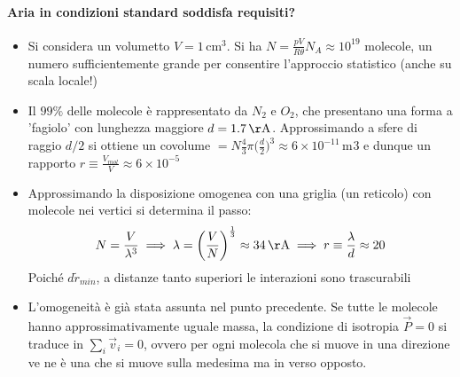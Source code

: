 \documentclass[10pt, oneside]{book}
\newcommand{\angstrom}{\, \mathrm{\AA}}
\newcommand{\meters}[2]{\, \mathrm{#2 m^{#1}}}
\begin{document}
\paragraph{Aria in condizioni standard soddisfa requisiti?} 
\begin{itemize}
\item Si considera un volumetto $V = 1 \, \mathrm{cm^3}$. Si ha $\displaystyle N = \frac{pV}{R \theta} N_A \approx 10^{19}$ molecole, un numero sufficientemente grande per consentire l'approccio statistico (anche su scala locale!)
\item Il $99 \% $ delle molecole è rappresentato da $N_2$ e $O_2$, che presentano una forma a 'fagiolo' con lunghezza maggiore $d = 1.7 \angstrom$. Approssimando a sfere di raggio $d/2$ si ottiene un covolume $\displaystyle = N \frac{4}{3}\pi \bigg(\displaystyle \frac{d}{2}\bigg)^3 \approx 6 \times 10^{-11} \meters{}{}{3}$ e dunque un rapporto $\displaystyle r \equiv \frac{V_{mol}}{V} \approx 6 \times 10^{-5}$
\item Approssimando la disposizione omogenea con una griglia (un reticolo) con molecole nei vertici si determina il passo:
\[N = \frac{V}{\lambda^3} \implies \lambda = \bigg(\frac{V}{N}\bigg)^{\frac{1}{3}} \approx 34 \angstrom \implies r \equiv \frac{\lambda}{d} \approx 20\]
Poiché $d \tilde r_{min}$, a distanze tanto superiori le interazioni sono trascurabili
\item L'omogeneità è già stata assunta nel punto precedente. Se tutte le molecole hanno approssimativamente uguale massa, la condizione di isotropia $\vec{P} = 0$ si traduce in $\displaystyle \sum_i \vec{v}_i = 0$, ovvero per ogni molecola che si muove in una direzione ve ne è una che si muove sulla medesima ma in verso opposto. 
\end{itemize}
\end{document}
